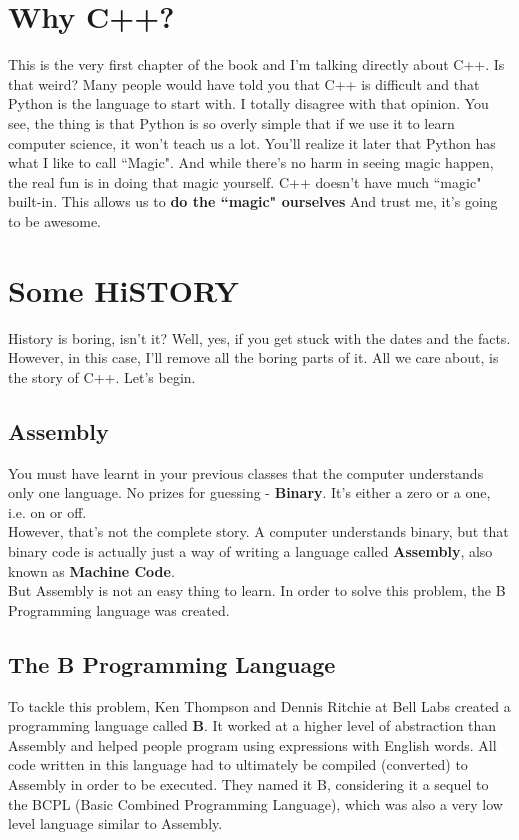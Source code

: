 \documentclass[letterpaper, 12pt]{book}
\begin{document}
\section{Why C++?}
This is the very first chapter of the book and I'm talking directly about C++. Is that weird? Many people would have told you that C++ is difficult and that Python is the language to start with. I totally disagree with that opinion. You see, the thing is that Python is so overly simple that if we use it to learn computer science, it won't teach us a lot. You'll realize it later that Python has what I like to call ``Magic". And while there's no harm in seeing magic happen, the real fun is in doing that magic yourself. C++ doesn't have much ``magic" built-in. This allows us to \textbf{do the ``magic" ourselves} And trust me, it's going to be awesome.
\section{Some HiSTORY}
History is boring, isn't it? Well, yes, if you get stuck with the dates and the facts. However, in this case, I'll remove all the boring parts of it. All we care about, is the story of C++. Let's begin.
\subsection{Assembly}
You must have learnt in your previous classes that the computer understands only one language. No prizes for guessing - \textbf{Binary}. It's either a zero or a one, i.e. on or off.\\
However, that's not the complete story. A computer understands binary, but that binary code is actually just a way of writing a language called \textbf{Assembly}, also known as \textbf{Machine Code}.\\ 
But Assembly is not an easy thing to learn. In order to solve this problem, the B Programming language was created.
\subsection{The B Programming Language}
To tackle this problem, Ken Thompson and Dennis Ritchie at Bell Labs created a programming language called \textbf{B}. It worked at a higher level of abstraction than Assembly and helped people program using expressions with English words. All code written in this language had to ultimately be compiled (converted) to Assembly in order to be executed. They named it B, considering it a sequel to the BCPL (Basic Combined Programming Language), which was also a very low level language similar to Assembly.
\end{document}
